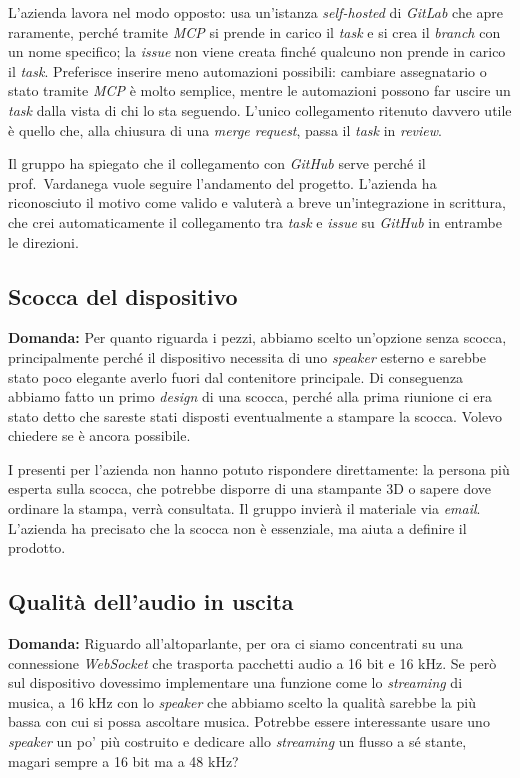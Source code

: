 \documentclass[12pt,a4paper]{article}
\begin{document}
L'azienda lavora nel modo opposto: usa un'istanza \emph{self-hosted} di \emph{GitLab} che apre raramente, perché tramite \emph{MCP} si prende in carico il \emph{task} e si crea il \emph{branch} con un nome specifico; la \emph{issue} non viene creata finché qualcuno non prende in carico il \emph{task}. Preferisce inserire meno automazioni possibili: cambiare assegnatario o stato tramite \emph{MCP} è molto semplice, mentre le automazioni possono far uscire un \emph{task} dalla vista di chi lo sta seguendo. L'unico collegamento ritenuto davvero utile è quello che, alla chiusura di una \emph{merge request}, passa il \emph{task} in \emph{review}.

Il gruppo ha spiegato che il collegamento con \emph{GitHub} serve perché il prof.\ Vardanega vuole seguire l'andamento del progetto. L'azienda ha riconosciuto il motivo come valido e valuterà a breve un'integrazione in scrittura, che crei automaticamente il collegamento tra \emph{task} e \emph{issue} su \emph{GitHub} in entrambe le direzioni.

\subsection{Scocca del dispositivo}

\textbf{Domanda:} Per quanto riguarda i pezzi, abbiamo scelto un'opzione senza scocca, principalmente perché il dispositivo necessita di uno \emph{speaker} esterno e sarebbe stato poco elegante averlo fuori dal contenitore principale. Di conseguenza abbiamo fatto un primo \emph{design} di una scocca, perché alla prima riunione ci era stato detto che sareste stati disposti eventualmente a stampare la scocca. Volevo chiedere se è ancora possibile.

I presenti per l'azienda non hanno potuto rispondere direttamente: la persona più esperta sulla scocca, che potrebbe disporre di una stampante 3D o sapere dove ordinare la stampa, verrà consultata. Il gruppo invierà il materiale via \emph{email}. L'azienda ha precisato che la scocca non è essenziale, ma aiuta a definire il prodotto.

\subsection{Qualità dell'audio in uscita}

\textbf{Domanda:} Riguardo all'altoparlante, per ora ci siamo concentrati su una connessione \emph{WebSocket} che trasporta pacchetti audio a 16 bit e 16 kHz. Se però sul dispositivo dovessimo implementare una funzione come lo \emph{streaming} di musica, a 16 kHz con lo \emph{speaker} che abbiamo scelto la qualità sarebbe la più bassa con cui si possa ascoltare musica. Potrebbe essere interessante usare uno \emph{speaker} un po' più costruito e dedicare allo \emph{streaming} un flusso a sé stante, magari sempre a 16 bit ma a 48 kHz?
\end{document}
